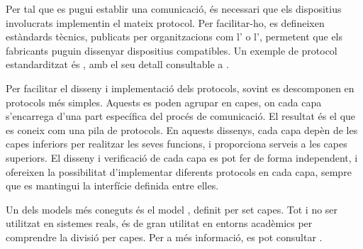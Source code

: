 \documentclass{tfgitic}[2024/07/01]
\begin{document}
Per tal que es pugui establir una comunicació, és necessari que els dispositius involucrats implementin el mateix protocol. Per facilitar-ho, es defineixen estàndards tècnics, publicats per organitzacions com l' o l', permetent que els fabricants puguin dissenyar dispositius compatibles. Un exemple de protocol estandarditzat és , amb el seu detall consultable a \cite{fielding_hypertext_2014}.

Per facilitar el disseny i implementació dels protocols, sovint es descomponen en protocols més simples. Aquests es poden agrupar en capes, on cada capa s'encarrega d'una part específica del procés de comunicació. El resultat és el que es coneix com una pila de protocols. 
En aquests dissenys, cada capa depèn de les capes inferiors per realitzar les seves funcions, i proporciona serveis a les capes superiors. El disseny i verificació de cada capa es pot fer de forma independent, i ofereixen la possibilitat d'implementar diferents protocols en cada capa, sempre que es mantingui la interfície definida entre elles.

Un dels models més coneguts és el model , definit per set capes. Tot i no ser utilitzat en sistemes reals, és de gran utilitat en entorns acadèmics per comprendre la divisió per capes. Per a més informació, es pot consultar \cite{noauthor_isoiec_1994}.
\end{document}
